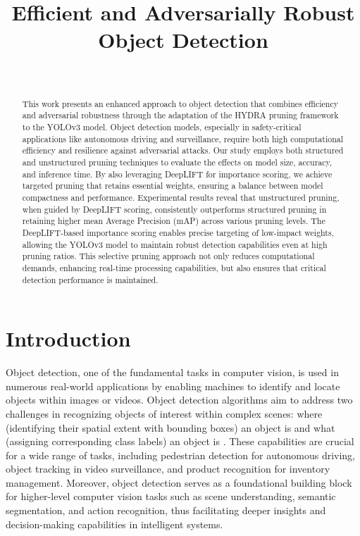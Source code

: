 \documentclass[journal,onecolumn,12pt]{IEEEtran}
\begin{document}
\title{Efficient and Adversarially Robust Object Detection}
\author{
 \\
}

\maketitle

\begin{abstract}
This work presents an enhanced approach to object detection that combines efficiency and adversarial robustness through the adaptation of the HYDRA pruning framework to the YOLOv3 model. Object detection models, especially in safety-critical applications like autonomous driving and surveillance, require both high computational efficiency and resilience against adversarial attacks. Our study employs both structured and unstructured pruning techniques to evaluate the effects on model size, accuracy, and inference time. By also leveraging DeepLIFT for importance scoring, we achieve targeted pruning that retains essential weights, ensuring a balance between model compactness and performance. Experimental results reveal that unstructured pruning, when guided by DeepLIFT scoring, consistently outperforms structured pruning in retaining higher mean Average Precision (mAP) across various pruning levels. The DeepLIFT-based importance scoring enables precise targeting of low-impact weights, allowing the YOLOv3 model to maintain robust detection capabilities even at high pruning ratios. This selective pruning approach not only reduces computational demands, enhancing real-time processing capabilities, but also ensures that critical detection performance is maintained.
\end{abstract}


\section{Introduction}

Object detection, one of the fundamental tasks in computer vision, is used in numerous real-world applications by enabling machines to identify and locate objects within images or videos. Object detection algorithms aim to address two challenges in recognizing objects of interest within complex scenes: where (identifying their spatial extent with bounding boxes) an object is and what (assigning corresponding class labels) an object is \cite{zhao2019objectdetectiondeeplearning}. These capabilities are crucial for a wide range of tasks, including pedestrian detection for autonomous driving, object tracking in video surveillance, and product recognition for inventory management. Moreover, object detection serves as a foundational building block for higher-level computer vision tasks such as scene understanding, semantic segmentation, and action recognition, thus facilitating deeper insights and decision-making capabilities in intelligent systems.
\end{document}

